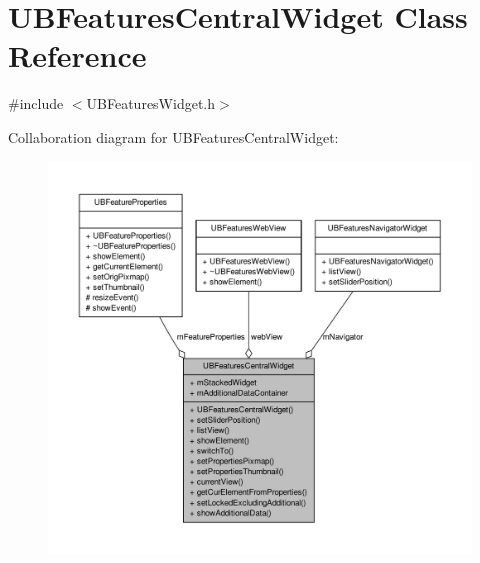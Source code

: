 \hypertarget{class_u_b_features_central_widget}{\section{U\-B\-Features\-Central\-Widget Class Reference}
\label{da/d07/class_u_b_features_central_widget}
}


{\ttfamily \#include $<$U\-B\-Features\-Widget.\-h$>$}



Collaboration diagram for U\-B\-Features\-Central\-Widget\-:
\nopagebreak
\begin{figure}[H]
\begin{center}
\leavevmode
\includegraphics[width=350pt]{d1/de5/class_u_b_features_central_widget__coll__graph}
\end{center}
\end{figure}
